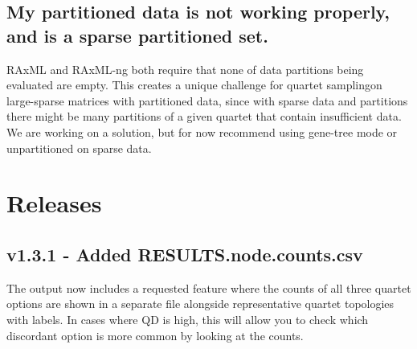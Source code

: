 \documentclass[letterpaper,12pt,english]{sphinxmanual}
\begin{document}
\section{My partitioned data is not working properly, and is a sparse partitioned set.}
\label{\detokenize{faq:my-partitioned-data-is-not-working-properly-and-is-a-sparse-partitioned-set}}
RAxML and RAxML-ng both require that none of data partitions being evaluated are empty.  This creates a unique challenge for quartet samplingon large-sparse matrices with partitioned data, since with sparse data and partitions there might be many partitions of a given quartet that contain insufficient data.  We are working on a solution, but for now recommend using gene-tree mode or unpartitioned on sparse data.


\chapter{Releases}
\label{\detokenize{releases:releases}}\label{\detokenize{releases:id1}}\label{\detokenize{releases::doc}}

\section{v1.3.1 - Added RESULTS.node.counts.csv}
\label{\detokenize{releases:v1-3-1-added-results-node-counts-csv}}
The output now includes a requested feature where the counts of all three quartet options are shown in a separate file alongside representative quartet topologies with labels.  In cases where QD is high, this will allow you to check which discordant option is more common by looking at the counts.
\end{document}
